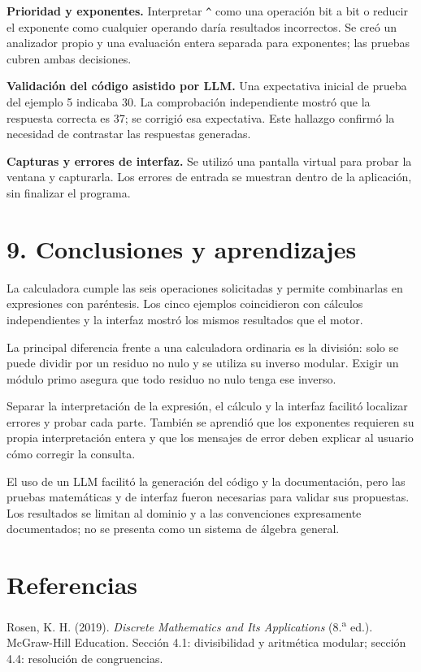 \documentclass[11pt,a4paper]{article}
\begin{document}
\textbf{Prioridad y exponentes.} Interpretar \texttt{\^{}} como una operación
bit a bit o reducir el exponente como cualquier operando daría resultados
incorrectos. Se creó un analizador propio y una evaluación entera separada
para exponentes; las pruebas cubren ambas decisiones.

\textbf{Validación del código asistido por LLM.} Una expectativa inicial de
prueba del ejemplo 5 indicaba 30. La comprobación independiente mostró que
la respuesta correcta es 37; se corrigió esa expectativa. Este hallazgo
confirmó la necesidad de contrastar las respuestas generadas.

\textbf{Capturas y errores de interfaz.} Se utilizó una pantalla virtual para
probar la ventana y capturarla. Los errores de entrada se muestran dentro de
la aplicación, sin finalizar el programa.

\newpage
\section*{9. Conclusiones y aprendizajes}
La calculadora cumple las seis operaciones solicitadas y permite combinarlas
en expresiones con paréntesis. Los cinco ejemplos coincidieron con cálculos
independientes y la interfaz mostró los mismos resultados que el motor.

La principal diferencia frente a una calculadora ordinaria es la división:
solo se puede dividir por un residuo no nulo y se utiliza su inverso modular.
Exigir un módulo primo asegura que todo residuo no nulo tenga ese inverso.

Separar la interpretación de la expresión, el cálculo y la interfaz facilitó
localizar errores y probar cada parte. También se aprendió que los exponentes
requieren su propia interpretación entera y que los mensajes de error deben
explicar al usuario cómo corregir la consulta.

El uso de un LLM facilitó la generación del código y la documentación, pero
las pruebas matemáticas y de interfaz fueron necesarias para validar sus
propuestas. Los resultados se limitan al dominio y a las convenciones
expresamente documentados; no se presenta como un sistema de álgebra general.

\section*{Referencias}
Rosen, K. H. (2019). \textit{Discrete Mathematics and Its Applications}
(8.\textsuperscript{a} ed.). McGraw-Hill Education. Sección 4.1: divisibilidad
y aritmética modular; sección 4.4: resolución de congruencias.
\end{document}
